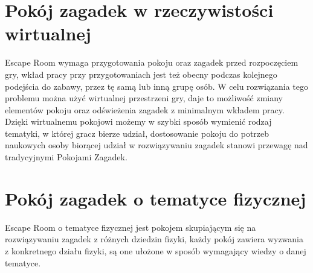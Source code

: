 \section{Pokój zagadek w rzeczywistości wirtualnej}
Escape Room wymaga przygotowania pokoju oraz zagadek przed rozpoczęciem gry, wkład pracy przy przygotowaniach jest też obecny podczas kolejnego podejścia do zabawy, przez tę samą lub inną grupę osób. W celu rozwiązania tego problemu można użyć wirtualnej przestrzeni gry, daje to możliwość zmiany elementów pokoju oraz odświeżenia zagadek z minimalnym wkładem pracy.
Dzięki wirtualnemu pokojowi możemy w szybki sposób wymienić rodzaj tematyki, w której gracz bierze udział, dostosowanie pokoju do potrzeb naukowych osoby biorącej udział w rozwiązywaniu zagadek stanowi przewagę nad tradycyjnymi Pokojami Zagadek.

\section{Pokój zagadek o tematyce fizycznej}
Escape Room o tematyce fizycznej jest pokojem skupiającym się na rozwiązywaniu zagadek z różnych dziedzin fizyki, każdy pokój zawiera wyzwania z konkretnego działu fizyki, są one ułożone w sposób wymagający wiedzy o danej tematyce. 

